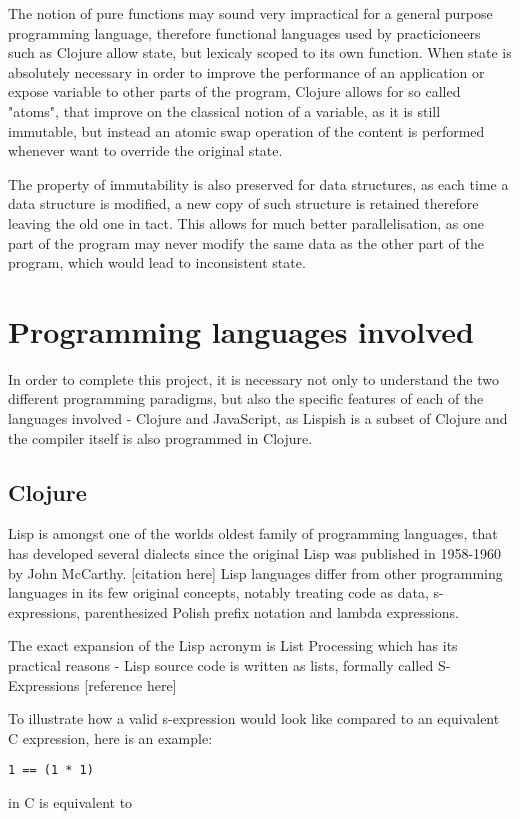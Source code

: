 The notion of pure functions may sound very impractical for a general purpose programming language, therefore functional languages used by practicioneers such as Clojure allow state, but lexicaly scoped to its own function. 
When state is absolutely necessary in order to improve the performance of an application or expose variable to other parts of the program, Clojure allows for so called "atoms", that improve on the classical notion of a variable, as it is still immutable, but instead an atomic swap operation of the content is performed whenever want to override the original state.

The property of immutability is also preserved for data structures, as each time a data structure is modified, a new copy of such structure is retained therefore leaving the old one in tact. This allows for much better parallelisation, as one part of the program may never modify the same data as the other part of the program, which would lead to inconsistent state.

\section{Programming languages involved}
In order to complete this project, it is necessary not only to understand the two different programming paradigms, but also the specific features of each of the languages involved - Clojure and JavaScript, as Lispish is a subset of Clojure and the compiler itself is also programmed in Clojure. 

\subsection{Clojure}
Lisp is amongst one of the worlds oldest family of programming languages, that has developed several dialects since the original Lisp was published in 1958-1960 by John McCarthy. [citation here]
Lisp languages differ from other programming languages in its few original concepts, notably treating code as data, s-expressions, parenthesized Polish prefix notation and lambda expressions.

The exact expansion of the Lisp acronym is List Processing which has its practical reasons - Lisp source code is written as lists, formally called S-Expressions [reference here]

To illustrate how a valid s-expression would look like compared to an equivalent C expression, here is an example:

\begin{lstlisting}
1 == (1 * 1)
\end{lstlisting}
in C is equivalent to


